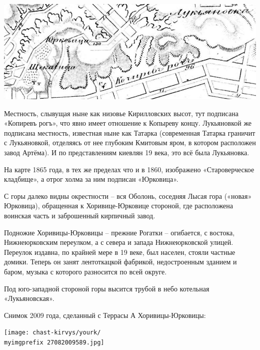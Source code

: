 \begin{center}
\includegraphics[width=\linewidth]{chast-kirvys/yourk/1860-part.jpg}
\end{center} 

Местность, слывущая ныне как низовье Кирилловских высот, тут подписана «Копиревъ рогъ», что явно имеет отношение к Копыреву концу. Лукьяновкой же подписана местность, известная ныне как Татарка (современная Татарка граничит с Лукьяновкой, отделяясь от нее глубоким Кмитовым яром, в котором расположен завод Артёма). И по представлениям киевлян 19 века, это всё была Лукьяновка.


На карте 1865 года, в тех же пределах что и в 1860, изображено «Староверческое кладбище», а отрог холма за ним подписан «Юрковица».
  
С горы далеко видны окрестности – вся Оболонь, соседняя Лысая гора («новая» Юрковица), обращенная к Хоривице-Юрковице стороной, где расположена воинская часть и заброшенный кирпичный завод.

Подножие Хоривицы-Юрковицы – прежние Рогатки – огибается, с востока, Нижнеюрковским переулком, а с севера и запада Нижнеюрковской улицей. Переулок издавна, по крайней мере в 19 веке, был населен, стояли частные домики. Теперь он занят лентоткацкой фабрикой, недостроенным зданием и баром, музыка с которого разносится по всей округе. 

Под юго-западной стороной горы высится трубой в небо котельная «Лукьяновская».

Снимок 2009 года, сделанный с Террасы А Хоривицы-Юрковицы: 

\begin{center}
\texttt{[image: chast-kirvys/yourk/\\myimgprefix 27082009589.jpg]}
\end{center} 

